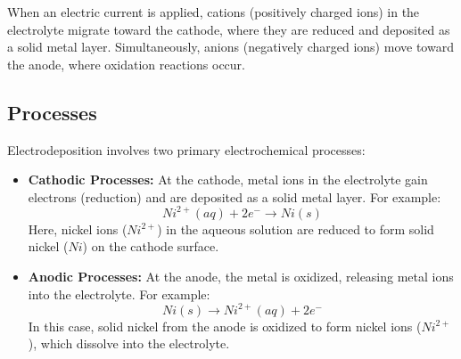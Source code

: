 \documentclass{report}
\begin{document}
When an electric current is applied, cations (positively charged ions) in the electrolyte migrate toward the cathode, where they are reduced and deposited as a solid metal layer. Simultaneously, anions (negatively charged ions) move toward the anode, where oxidation reactions occur.

\subsection{Processes}
Electrodeposition involves two primary electrochemical processes:
\begin{itemize}
    \item \textbf{Cathodic Processes:} At the cathode, metal ions in the electrolyte gain electrons (reduction) and are deposited as a solid metal layer. For example:
    $$Ni^{2+}(aq) + 2e^- \rightarrow Ni(s)$$
    Here, nickel ions ($Ni^{2+}$) in the aqueous solution are reduced to form solid nickel ($Ni$) on the cathode surface.
    
    \item \textbf{Anodic Processes:} At the anode, the metal is oxidized, releasing metal ions into the electrolyte. For example:
    $$Ni(s) \rightarrow Ni^{2+}(aq) + 2e^-$$
    In this case, solid nickel from the anode is oxidized to form nickel ions ($Ni^{2+}$), which dissolve into the electrolyte.
\end{itemize}
\end{document}
